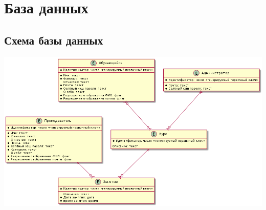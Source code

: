 \documentclass[11pt]{article}
\begin{document}
\section{База данных}
\label{sec:orgfedac28}
\subsection{Схема базы данных}
\label{sec:orgc65331a}
\begin{center}
\includegraphics[width=.9\linewidth]{db.png}
\end{center}
\end{document}
